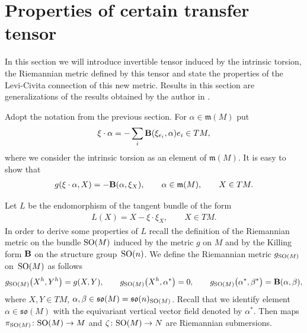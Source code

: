 \documentclass[pdftex]{sigma}
\numberwithin{equation}{section}
\begin{document}
\section{Properties of certain transfer tensor}\label{section4}

In this section we will introduce invertible tensor induced by the intrinsic torsion, the Riemannian metric def\/ined by this tensor and state the properties of the Levi-Civita connection of this new metric. Results in this section are generalizations of the results obtained by the author in \cite{kn}.

Adopt the notation from the previous section. For $\alpha\in \mathfrak{m}(M)$ put
\begin{gather*}
\xi\cdot \alpha=-\sum_i {\bf B}(\xi_{e_i},\alpha)e_i\in TM,
\end{gather*}
where we consider the intrinsic torsion as an element of $\mathfrak{m}(M)$. It is easy to show that
\begin{gather}\label{eq:xidotT}
g(\xi\cdot \alpha,X)=-{\bf B}(\alpha,\xi_X),\qquad \alpha\in\mathfrak{m}(M),\qquad X\in TM.
\end{gather}

Let $L$ be the endomorphism of the tangent bundle of the form
\begin{gather*}
L(X)=X-\xi\cdot \xi_X,\qquad X\in TM.
\end{gather*}
In order to derive some properties of $L$ recall the def\/inition of the Riemannian metric on the bundle ${\rm SO}(M)$ induced by the metric $g$ on $M$ and by the Killing form ${\bf B}$ on the structure group~${\rm SO}(n)$. We def\/ine the Riemannian metric $g_{{\rm SO}(M)}$ on~${\rm SO}(M)$ as follows
\begin{gather*}
g_{{\rm SO}(M)}\big(X^h,Y^h\big) =g(X,Y), \qquad
g_{{\rm SO}(M)}\big(X^h,\alpha^{\ast}\big) =0, \qquad
g_{{\rm SO}(M)}\big(\alpha^{\ast},\beta^{\ast}\big) ={\bf B}(\alpha,\beta),
\end{gather*}
where $X,Y\in TM$, $\alpha,\beta\in\mathfrak{so}(M)=\mathfrak{so}(n)_{{\rm SO}(M)}$. Recall that we identify element $\alpha\in \mathfrak{so}(M)$ with the equivariant vertical vector f\/ield denoted by $\alpha^{\ast}$. Then maps $\pi_{{\rm SO}(M)}\colon {\rm SO}(M)\to M$ and $\zeta\colon {\rm SO}(M)\to N$ are Riemannian submersions.
\end{document}
